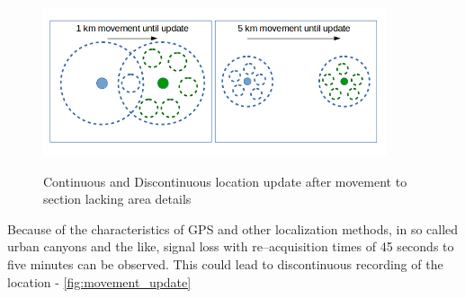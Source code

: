 \begin{figure}[!ht]
	\centering
	\includegraphics[width=0.9\textwidth]{images/movement_update.png}\\
	\caption{Continuous and Discontinuous location update after movement to section lacking area details  }
	\label{fig:movement_update}
\end{figure}
\FloatBarrier

Because of the characteristics of GPS and other localization methods, in so called urban canyons and the like, signal loss with re–acquisition times of 45 seconds to five minutes can be observed. This could lead to discontinuous recording of the location - \autoref{fig:movement_update}
